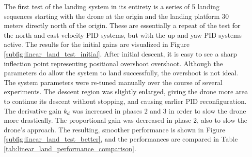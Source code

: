 The first test of the landing system in its entirety is a series of 5 landing sequences starting with the drone at the origin and the landing platform 30 meters directly north of the origin. These are essentially a repeat of the test for the north and east velocity PID systems, but with the up and yaw PID systems active. The results for the initial gains are visualized in Figure \ref{subfig:linear_land_test_initial}. After initial descent, it is easy to see a sharp inflection point representing positional overshoot overshoot. Although the parameters do allow the system to land successfully, the overshoot is not ideal. The system parameters were re-tuned manually over the course of several experiments. The descent region was slightly enlarged, giving the drone more area to continue its descent without stopping, and causing earlier PID reconfiguration. The derivative gain $k_d$ was increased in phases 2 and 3 in order to slow the drone more drastically. The proportional gain was decreased in phase 2, also to slow the drone's approach. The resulting, smoother performance is shown in Figure \ref{subfig:linear_land_test_better}, and the performances are compared in Table \ref{tab:linear_land_performance_comparison}.

